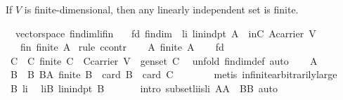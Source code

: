 \begin{isabellebody}
%
\endisatagproof
{\isafoldproof}%
%
\isadelimproof
%
\endisadelimproof
%
\begin{isamarkuptext}%
If $V$ is finite-dimensional, then any linearly independent set is finite.%
\end{isamarkuptext}%
\isamarkuptrue%
\isamarkupfalse%
\ {\isacharparenleft}\ vectorspace{\isacharparenright}\ fin{\isacharunderscore}dim{\isacharunderscore}li{\isacharunderscore}fin{\isacharcolon}\isanewline
\ \ \ fd{\isacharcolon}\ {\isachardoublequoteopen}fin{\isacharunderscore}dim{\isachardoublequoteclose}\ \ li{\isacharcolon}\ {\isachardoublequoteopen}lin{\isacharunderscore}indpt\ A{\isachardoublequoteclose}\ \ inC{\isacharcolon}\ {\isachardoublequoteopen}A{\isasymsubseteq}carrier\ V{\isachardoublequoteclose}\isanewline
\ \ \ fin{\isacharcolon}\ {\isachardoublequoteopen}finite\ A{\isachardoublequoteclose}\isanewline
%
\isadelimproof
%
\endisadelimproof
%
\isatagproof
{}\isamarkupfalse%
\ {\isacharparenleft}rule\ ccontr{\isacharparenright}\isanewline
\ \ \isamarkupfalse%
\ A{\isacharcolon}\ {\isachardoublequoteopen}{\isasymnot}finite\ A{\isachardoublequoteclose}\isanewline
\ \ \isamarkupfalse%
\ fd\ \isamarkupfalse%
\ C\ \ C{\isacharcolon}\ {\isachardoublequoteopen}finite\ C\ {\isasymand}\ C{\isasymsubseteq}carrier\ V\ {\isasymand}\ gen{\isacharunderscore}set\ C{\isachardoublequoteclose}\ \isamarkupfalse%
\ {\isacharparenleft}unfold\ fin{\isacharunderscore}dim{\isacharunderscore}def{\isacharcomma}\ auto{\isacharparenright}\isanewline
\ \ \isamarkupfalse%
\ A\ \isamarkupfalse%
\ B\ \ B{\isacharcolon}\ {\isachardoublequoteopen}B{\isasymsubseteq}A{\isasymand}\ finite\ B\ {\isasymand}\ card\ B\ {\isacharequal}\ card\ C\ {\isacharplus}\ {}{\isachardoublequoteclose}\isanewline
\ \ \ \ \isamarkupfalse%
\ {\isacharparenleft}metis\ infinite{\isacharunderscore}arbitrarily{\isacharunderscore}large{\isacharparenright}\ \isanewline
\ \ \isamarkupfalse%
\ B\ li\ \isamarkupfalse%
\ liB{\isacharcolon}\ {\isachardoublequoteopen}lin{\isacharunderscore}indpt\ B{\isachardoublequoteclose}\ \isanewline
\ \ \ \ \isamarkupfalse%
\ {\isacharparenleft}intro\ subset{\isacharunderscore}li{\isacharunderscore}is{\isacharunderscore}li{\isacharbrackleft}\ {\isacharquery}A{\isacharequal}{\isachardoublequoteopen}A{\isachardoublequoteclose}\ \ {\isacharquery}B{\isacharequal}{\isachardoublequoteopen}B{\isachardoublequoteclose}{\isacharbrackright}{\isacharcomma}\ auto{\isacharparenright}\isanewline

\end{isabellebody}
